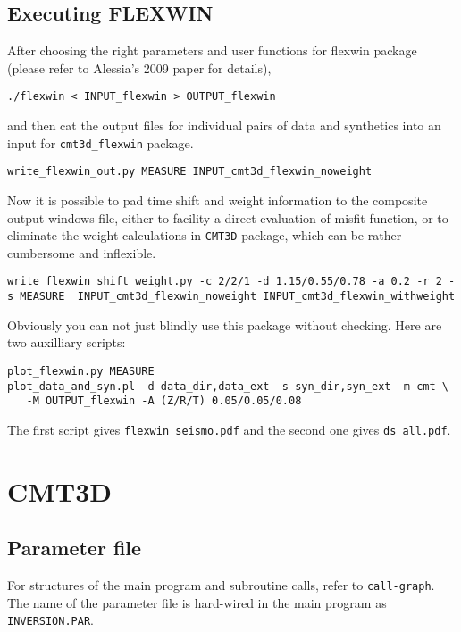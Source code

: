 \documentclass[12pt,titlepage,fleqn]{article}
\begin{document}
\subsection{Executing FLEXWIN}
After choosing the right parameters and user functions for flexwin package (please refer to Alessia's 2009 paper for details), 
\begin{verbatim}
./flexwin < INPUT_flexwin > OUTPUT_flexwin
\end{verbatim}
and then cat the output files for individual pairs of data and synthetics into an input for \verb=cmt3d_flexwin= package.
\begin{verbatim}
write_flexwin_out.py MEASURE INPUT_cmt3d_flexwin_noweight
\end{verbatim}
Now it is possible to pad time shift and weight information to the composite output windows file, either to facility a direct evaluation of misfit function, or to eliminate the weight calculations in \verb+CMT3D+ package, which can be rather cumbersome and inflexible.
\begin{verbatim}
write_flexwin_shift_weight.py -c 2/2/1 -d 1.15/0.55/0.78 -a 0.2 -r 2 -s MEASURE  INPUT_cmt3d_flexwin_noweight INPUT_cmt3d_flexwin_withweight
\end{verbatim}
Obviously you can not just blindly use this package without checking. Here are two auxilliary scripts:
\begin{verbatim}
plot_flexwin.py MEASURE 
plot_data_and_syn.pl -d data_dir,data_ext -s syn_dir,syn_ext -m cmt \
   -M OUTPUT_flexwin -A (Z/R/T) 0.05/0.05/0.08 
\end{verbatim}
The first script gives \verb+flexwin_seismo.pdf+ and the second one gives \verb+ds_all.pdf+.
\section{CMT3D}
\subsection{Parameter file}
For structures of the main program and subroutine calls, refer to \verb=call-graph=. The name of the parameter file is hard-wired in the main program as \verb=INVERSION.PAR=.
\end{document}
